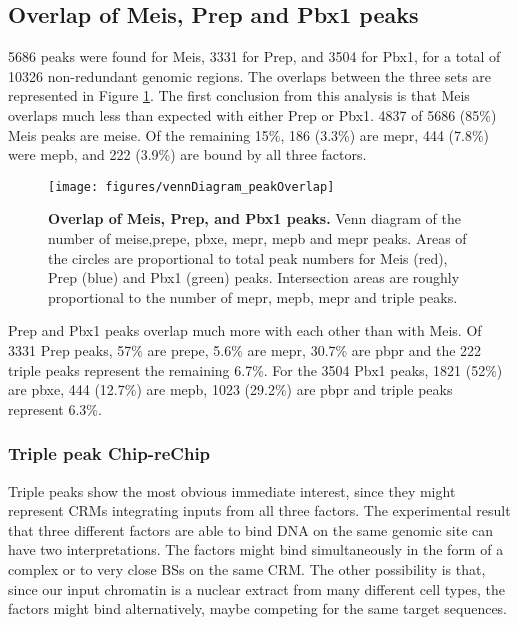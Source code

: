 \subsection{Overlap of Meis, Prep and Pbx1 peaks}

5686 peaks were found for Meis, 3331 for Prep, and 3504 for Pbx1, for a total of 10326 non-redundant genomic regions. The overlaps between the three sets are represented in Figure \ref{fig:peakOverlap}. The first conclusion from this analysis is that Meis overlaps much less than expected with either Prep or Pbx1. 4837 of 5686 (85\%) Meis peaks are \ac{meise}. Of the remaining 15\%, 186 (3.3\%) are \ac{mepr}, 444 (7.8\%) were \ac{mepb}, and 222 (3.9\%) are bound by all three factors. 

\begin{figure}[]
  \centering
  \texttt{[image: figures/vennDiagram\_peakOverlap]}
  \caption[Overlap of Meis, Prep, and Pbx1 peaks]{\textbf{Overlap of Meis, Prep, and Pbx1 peaks.} Venn diagram of the number of \ac{meise},\ac{prepe}, \ac{pbxe}, \ac{mepr}, \ac{mepb} and \ac{mepr} peaks. Areas of the circles are proportional to total peak numbers for Meis (red), Prep (blue) and Pbx1 (green) peaks. Intersection areas are roughly proportional to the number of \ac{mepr}, \ac{mepb}, \ac{mepr} and triple peaks.}
  \label{fig:peakOverlap}
\end{figure}

Prep and Pbx1 peaks overlap much more with each other than with Meis. Of 3331 Prep peaks, 57\% are \ac{prepe},  5.6\% are \ac{mepr}, 30.7\% are \ac{pbpr} and the 222 triple peaks represent the remaining 6.7\%. For the 3504 Pbx1 peaks, 1821 (52\%) are \ac{pbxe}, 444 (12.7\%) are \ac{mepb}, 1023 (29.2\%) are \ac{pbpr} and triple peaks represent 6.3\%. 


\subsubsection{Triple peak Chip-reChip}

Triple peaks show the most obvious immediate interest, since they might represent \acp{CRM} integrating inputs from all three factors. The experimental result that three different factors are able to bind DNA on the same genomic site can have two interpretations. The factors might bind simultaneously in the form of a complex or to very close \acp{BS} on the same \ac{CRM}. The other possibility is that, since our input chromatin is a nuclear extract from many different cell types, the factors might bind alternatively, maybe competing for the same target sequences.

